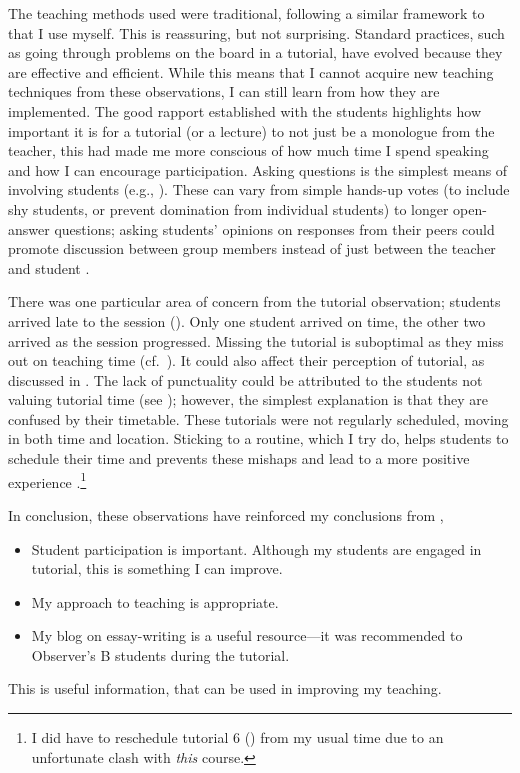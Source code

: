 The teaching methods used were traditional, following a similar framework to that I use myself. This is reassuring, but not surprising. Standard practices, such as going through problems on the board in a tutorial, have evolved because they are effective and efficient. While this means that I cannot acquire new teaching techniques from these observations, I can still learn from how they are implemented. The good rapport established with the students highlights how important it is for a tutorial (or a lecture) to not just be a monologue from the teacher, this had made me more conscious of how much time I spend speaking and how I can encourage participation. Asking questions is the simplest means of involving students (e.g., ). These can vary from simple hands-up votes (to include shy students, or prevent domination from individual students) to longer open-answer questions; asking students' opinions on responses from their peers could promote discussion between group members instead of just between the teacher and student \citep[cf.][]{Foster1981}. 

There was one particular area of concern from the tutorial observation; students arrived late to the session (). Only one student arrived on time, the other two arrived as the session progressed. Missing the tutorial is suboptimal as they miss out on teaching time (cf.\ ). It could also affect their perception of tutorial, as discussed in . The lack of punctuality could be attributed to the students not valuing tutorial time (see ); however, the simplest explanation is that they are confused by their timetable. These tutorials were not regularly scheduled, moving in both time and location. Sticking to a routine, which I try do, helps students to schedule their time and prevents these mishaps and lead to a more positive experience \citep{Zaitseva2013}.\footnote{I did have to reschedule tutorial 6 () from my usual time due to an unfortunate clash with \emph{this} course.}

In conclusion, these observations have reinforced my conclusions from ,
\begin{itemize}
\item Student participation is important. Although my students are engaged in tutorial, this is something I can improve.
\item My approach to teaching is appropriate.
\item My blog on essay-writing is a useful resource---it was recommended to Observer's B students during the tutorial.
\end{itemize}
This is useful information, that can be used in improving my teaching.
